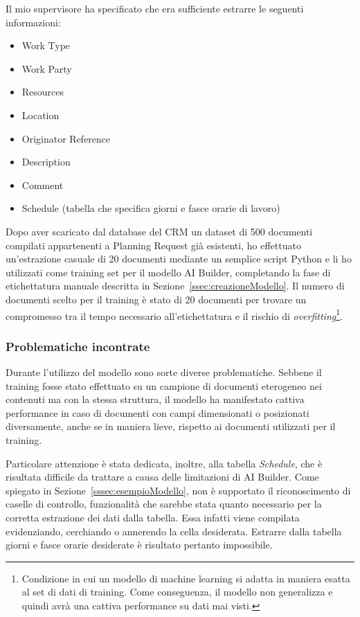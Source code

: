Il mio supervisore ha specificato che era sufficiente estrarre le seguenti informazioni:
\begin{itemize}
  \item Work Type
  \item Work Party
  \item Resources
  \item Location
  \item Originator Reference
  \item Description
  \item Comment
  \item Schedule (tabella che specifica giorni e fasce orarie di lavoro)
\end{itemize}
Dopo aver scaricato dal database del CRM un dataset di \num{500} documenti compilati appartenenti a Planning Request già esistenti, ho effettuato un'estrazione casuale di \num{20} documenti mediante un semplice script Python e li ho utilizzati come training set per il modello AI Builder, completando la fase di etichettatura manuale descritta in Sezione~\ref{ssec:creazioneModello}. Il numero di documenti scelto per il training è stato di \num{20} documenti per trovare un compromesso tra il tempo necessario all'etichettatura e il rischio di \textit{overfitting}\footnote{Condizione in cui un modello di machine learning si adatta in maniera esatta al set di dati di training. Come conseguenza, il modello non generalizza e quindi avrà una cattiva performance su dati mai visti.}. 

\subsubsection{Problematiche incontrate}
Durante l'utilizzo del modello sono sorte diverse problematiche.
Sebbene il training fosse stato effettuato su un campione di documenti eterogeneo nei contenuti ma con la stessa struttura, il modello ha manifestato cattiva performance in caso di documenti con campi dimensionati o posizionati diversamente, anche se in maniera lieve, rispetto ai documenti utilizzati per il training.

Particolare attenzione è stata dedicata, inoltre, alla tabella \textit{Schedule}, che è risultata difficile da trattare a causa delle limitazioni di AI Builder. Come spiegato in Sezione~\ref{sssec:esempioModello}, non è supportato il riconoscimento di caselle di controllo, funzionalità che sarebbe stata quanto necessario per la corretta estrazione dei dati dalla tabella. Essa infatti viene compilata evidenziando, cerchiando o annerendo la cella desiderata. Estrarre dalla tabella giorni e fasce orarie desiderate è risultato pertanto impossibile.

